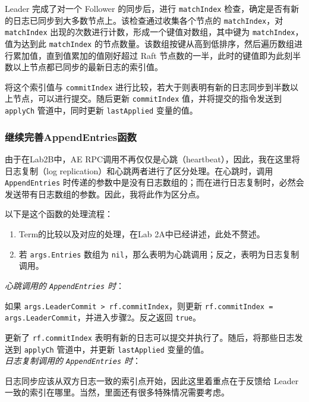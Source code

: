 \documentclass[]{article}
\begin{document}
	Leader 完成了对一个 Follower 的同步后，进行 \texttt{matchIndex} 检查，确定是否有新的日志已同步到大多数节点上。该检查通过收集各个节点的 \texttt{matchIndex}，对 \texttt{matchIndex} 出现的次数进行计数，形成一个键值对数组，其中键为 \texttt{matchIndex}，值为达到此 \texttt{matchIndex} 的节点数量。该数组按键从高到低排序，然后遍历数组进行累加值，直到值累加的值刚好超过 Raft 节点数的一半，此时的键值即为此刻半数以上节点都已同步的最新日志的索引值。
	
	将这个索引值与 \texttt{commitIndex} 进行比较，若大于则表明有新的日志同步到半数以上节点，可以进行提交。随后更新 \texttt{commitIndex} 值，并将提交的指令发送到 \texttt{applyCh} 管道中，同时更新 \texttt{lastApplied} 变量的值。
	
	\subsubsection{继续完善AppendEntries函数}
	由于在Lab2B中，AE RPC调用不再仅仅是心跳（heartbeat），因此，我在这里将日志复制（log replication）和心跳两者进行了区分处理。在心跳时，调用 \texttt{AppendEntries} 时传递的参数中是没有日志数组的；而在进行日志复制时，必然会发送带有日志数组的参数。因此，我将此作为区分点。
	
	以下是这个函数的处理流程：
	
	\begin{enumerate}
		\item Term的比较以及对应的处理，在Lab 2A中已经讲述，此处不赘述。
		
		\item 若 \texttt{args.Entries} 数组为 \texttt{nil}，那么表明为心跳调用；反之，表明为日志复制调用。
	\end{enumerate}
	
	\noindent \emph{心跳调用的 \texttt{AppendEntries} 时}：
	
	如果 \texttt{args.LeaderCommit > rf.commitIndex}，则更新 \texttt{rf.commitIndex = args.LeaderCommit}，并进入步骤2。反之返回 \texttt{true}。
	
	更新了 \texttt{rf.commitIndex} 表明有新的日志可以提交并执行了。随后，将那些日志发送到 \texttt{applyCh} 管道中，并更新 \texttt{lastApplied} 变量的值。\\
	
	
	\noindent \emph{日志复制调用的 \texttt{AppendEntries} 时}：
	
	日志同步应该从双方日志一致的索引点开始，因此这里着重点在于反馈给 Leader 一致的索引在哪里。当然，里面还有很多特殊情况需要考虑。
	
\end{document}
